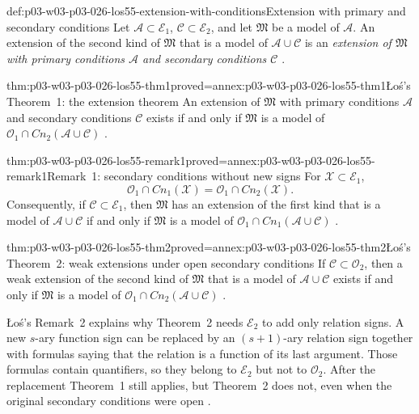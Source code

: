 \begin{hbdefinition}{def:p03-w03-p03-026-los55-extension-with-conditions}{Extension with primary and secondary conditions}
Let \(\mathcal A\subset\mathcal E_1\), \(\mathcal C\subset\mathcal E_2\), and
let \(\mathfrak M\) be a model of \(\mathcal A\).  An extension of the second
kind of \(\mathfrak M\) that is a model of \(\mathcal A\cup\mathcal C\) is an
\emph{extension of \(\mathfrak M\) with primary conditions \(\mathcal A\) and
secondary conditions \(\mathcal C\)} \cite[p.~45]{Los1955}.
\end{hbdefinition}

\begin{hbtheorem}{thm:p03-w03-p03-026-los55-thm1}{proved=annex:p03-w03-p03-026-los55-thm1}{\L o\'s's Theorem~1: the extension theorem}
An extension of \(\mathfrak M\) with primary conditions \(\mathcal A\) and
secondary conditions \(\mathcal C\) exists if and only if \(\mathfrak M\) is a
model of \(\mathcal O_1\cap\mathit{Cn}_2(\mathcal A\cup\mathcal C)\)
\cite[p.~45]{Los1955}.
\end{hbtheorem}

\begin{hblemma}{thm:p03-w03-p03-026-los55-remark1}{proved=annex:p03-w03-p03-026-los55-remark1}{Remark~1: secondary conditions without new signs}
For \(\mathcal X\subset\mathcal E_1\),
\[
 \mathcal O_1\cap\mathit{Cn}_1(\mathcal X)=\mathcal O_1\cap\mathit{Cn}_2(\mathcal X).
\]
Consequently, if \(\mathcal C\subset\mathcal E_1\), then \(\mathfrak M\) has an
extension of the first kind that is a model of \(\mathcal A\cup\mathcal C\)
if and only if \(\mathfrak M\) is a model of
\(\mathcal O_1\cap\mathit{Cn}_1(\mathcal A\cup\mathcal C)\)
\cite[p.~45]{Los1955}.
\end{hblemma}

\begin{hbtheorem}{thm:p03-w03-p03-026-los55-thm2}{proved=annex:p03-w03-p03-026-los55-thm2}{\L o\'s's Theorem~2: weak extensions under open secondary conditions}
If \(\mathcal C\subset\mathcal O_2\), then a weak extension of the second kind
of \(\mathfrak M\) that is a model of \(\mathcal A\cup\mathcal C\) exists if
and only if \(\mathfrak M\) is a model of
\(\mathcal O_1\cap\mathit{Cn}_2(\mathcal A\cup\mathcal C)\)
\cite[p.~45]{Los1955}.
\end{hbtheorem}

\L o\'s's Remark~2 explains why Theorem~2 needs \(\mathcal E_2\) to add only
relation signs.  A new \(s\)-ary function sign can be replaced by an
\((s+1)\)-ary relation sign together with formulas saying that the relation
is a function of its last argument.  Those formulas contain quantifiers, so
they belong to \(\mathcal E_2\) but not to \(\mathcal O_2\).  After the
replacement Theorem~1 still applies, but Theorem~2 does not, even when the
original secondary conditions were open \cite[pp.~45--46]{Los1955}.

